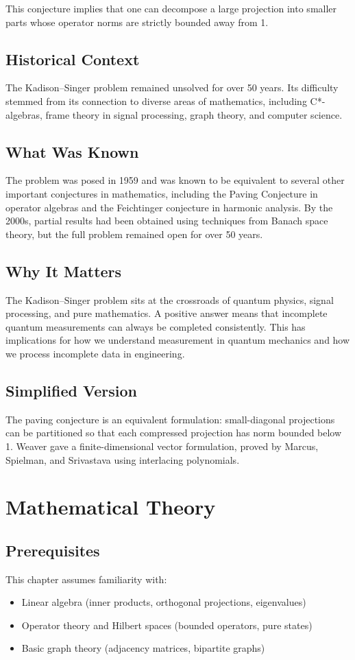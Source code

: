 This conjecture implies that one can decompose a large projection into smaller parts whose operator norms are strictly bounded away from 1.

\subsection{Historical Context}
The Kadison--Singer problem remained unsolved for over 50 years. Its difficulty stemmed from its connection to diverse areas of mathematics, including C*-algebras, frame theory in signal processing, graph theory, and computer science.

\subsection{What Was Known}
The problem was posed in 1959 and was known to be equivalent to several other important conjectures in mathematics, including the Paving Conjecture in operator algebras and the Feichtinger conjecture in harmonic analysis. By the 2000s, partial results had been obtained using techniques from Banach space theory, but the full problem remained open for over 50 years.

\subsection{Why It Matters}
The Kadison--Singer problem sits at the crossroads of quantum physics, signal processing, and pure mathematics. A positive answer means that incomplete quantum measurements can always be completed consistently. This has implications for how we understand measurement in quantum mechanics and how we process incomplete data in engineering.

\subsection{Simplified Version}
The paving conjecture is an equivalent formulation: small-diagonal projections can be partitioned so that each compressed projection has norm bounded below 1. Weaver gave a finite-dimensional vector formulation, proved by Marcus, Spielman, and Srivastava using interlacing polynomials.

\section{Mathematical Theory}


\subsection{Prerequisites}
This chapter assumes familiarity with:
\begin{itemize}
\item Linear algebra (inner products, orthogonal projections, eigenvalues)
\item Operator theory and Hilbert spaces (bounded operators, pure states)
\item Basic graph theory (adjacency matrices, bipartite graphs)
\end{itemize}

